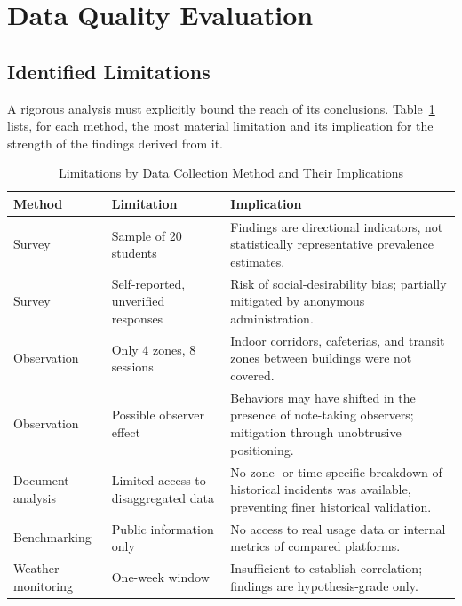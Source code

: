 \documentclass[conference]{IEEEtran}
\begin{document}
\section{Data Quality Evaluation}

\subsection{Identified Limitations}
A rigorous analysis must explicitly bound the reach of its
conclusions. Table~\ref{tab:limits} lists, for each method, the most
material limitation and its implication for the strength of the
findings derived from it.

\begin{table}[t]
\caption{Limitations by Data Collection Method and Their Implications}
\label{tab:limits}
\centering
\renewcommand{\arraystretch}{1.2}
\begin{tabular}{p{2.4cm}p{5.0cm}p{9.0cm}}
\toprule
\textbf{Method} & \textbf{Limitation} & \textbf{Implication} \\
\midrule
Survey & Sample of 20 students & Findings are directional indicators, not statistically representative prevalence estimates. \\
Survey & Self-reported, unverified responses & Risk of social-desirability bias; partially mitigated by anonymous administration. \\
Observation & Only 4 zones, 8 sessions & Indoor corridors, cafeterias, and transit zones between buildings were not covered. \\
Observation & Possible observer effect & Behaviors may have shifted in the presence of note-taking observers; mitigation through unobtrusive positioning. \\
Document analysis & Limited access to disaggregated data & No zone- or time-specific breakdown of historical incidents was available, preventing finer historical validation. \\
Benchmarking & Public information only & No access to real usage data or internal metrics of compared platforms. \\
Weather monitoring & One-week window & Insufficient to establish correlation; findings are hypothesis-grade only. \\
\bottomrule
\end{tabular}
\end{table}
\end{document}
